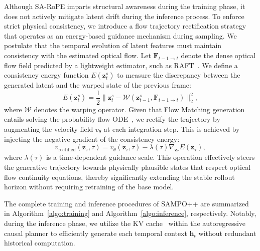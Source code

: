 Although SA-RoPE imparts structural awareness during the training phase, it does not actively mitigate latent drift during the inference process. To enforce strict physical consistency, we introduce a flow trajectory rectification strategy that operates as an energy-based guidance mechanism during sampling. We postulate that the temporal evolution of latent features must maintain consistency with the estimated optical flow. Let $\boldsymbol{F}_{t-1 \to t}$ denote the dense optical flow field predicted by a lightweight estimator, such as RAFT~\cite{teed2020raft}. We define a consistency energy function $E(\boldsymbol{z}_t^s)$ to measure the discrepancy between the generated latent and the warped state of the previous frame:
\begin{equation}
    E(\boldsymbol{z}_t^s) = \frac{1}{2} \| \boldsymbol{z}_t^s - \mathcal{W}(\boldsymbol{z}_{t-1}^s, \boldsymbol{F}_{t-1 \to t}) \|_2^2,
\end{equation}
where $\mathcal{W}$ denotes the warping operator. Given that Flow Matching generation entails solving the probability flow ODE~\cite{lipman2023flow, albergo2025stochastic}, we rectify the trajectory by augmenting the velocity field $v_\theta$ at each integration step. This is achieved by injecting the negative gradient of the consistency energy:
\begin{equation}
    v_{\text{rectified}}(\boldsymbol{z}_\tau, \tau) = v_\theta(\boldsymbol{z}_\tau, \tau) - \lambda(\tau) \nabla_{\boldsymbol{z}_\tau} E(\boldsymbol{z}_\tau),
\end{equation}
where $\lambda(\tau)$ is a time-dependent guidance scale. This operation effectively steers the generative trajectory towards physically plausible states that respect optical flow continuity equations, thereby significantly extending the stable rollout horizon without requiring retraining of the base model.

The complete training and inference procedures of SAMPO++ are summarized in Algorithm~\ref{algo:training} and Algorithm~\ref{algo:inference}, respectively. Notably, during the inference phase, we utilize the KV cache~\cite{pope2023efficiently} within the autoregressive causal planner to efficiently generate each temporal context $\boldsymbol{h}_t$ without redundant historical computation.